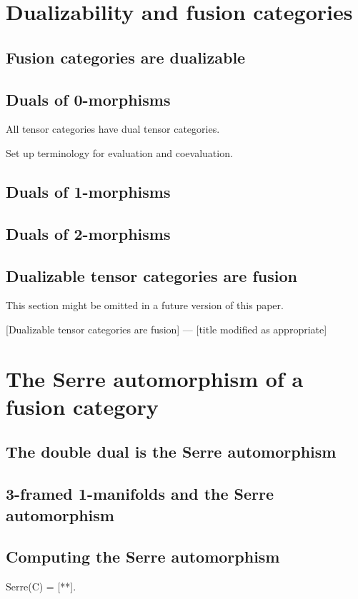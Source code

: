 \documentclass{amsart}
\begin{document}
\section{Dualizability and fusion categories}
\subsection{Fusion categories are dualizable}
\subsection{Duals of 0-morphisms} All tensor categories have dual tensor categories.

{\color{CSPcolor} Set up terminology for evaluation and coevaluation.}

\subsection{Duals of 1-morphisms} 
\subsection{Duals of 2-morphisms}
\subsection{Dualizable tensor categories are fusion}

This section might be omitted in a future version of this paper. 

[Dualizable tensor categories are fusion] --- [title modified as appropriate]

\section{The Serre automorphism of a fusion category}


\subsection{The double dual is the Serre automorphism}
\subsection{3-framed 1-manifolds and the Serre automorphism}
\subsection{Computing the Serre automorphism}
\begin{theorem}
Serre(C) = [**].
\end{theorem}
\end{document}
